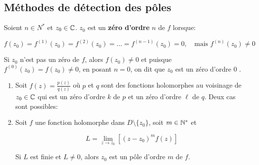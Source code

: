 \subsection{Méthodes de détection des pôles}

\begin{definition}
    Soient $n \in N^\ast$ et $z_0 \in \mathbb{C}$. $z_0$ est un \textbf{zéro d'ordre} $n$ de $f$ lorsque:
    
    \[ f(z_0) = f^{(1)}(z_0) = f^{(2)}(z_0) = \ldots = f^{(n-1)}(z_0) = 0 , \quad \textrm{mais } f^{(n)}(z_0) \neq 0 \]
\end{definition}

\begin{convention}
    Si $z_0$ n'est pas un zéro de $f$, alors $f(z_0) \neq 0$ et puisque $f^{(0)}(z_0) = f(z_0) \neq 0$, en posant $n=0$, on dit que \og $z_0$ est un zéro d'ordre 0 \fg{}.
\end{convention}

\begin{method}\hfill
    
    \begin{enumerate}[label=\alph*)]
    \item 
    Soit $f(z) = \frac{p(z)}{q(z)}$ où $p$ et $q$ sont des fonctions holomorphes au voisinage de $z_0 \in \mathbb{C}$ qui est un zéro d'ordre $k$ de $p$ et un zéro d'ordre $\ell$ de $q$.
    Deux cas sont possibles:

    \item 
    Soit $f$ une fonction holomorphe dans $D \setminus \{z_0\}$, soit $m \in \mathbb{N}^\ast$ et
    
    \[ L = \lim\limits_{z \rightarrow z_0} \left[ (z - z_0)^m f(z) \right] \]
    
    Si $L$ est finie et $L \neq 0$, alors $z_0$ est un pôle d'ordre $m$ de $f$.
    \end{enumerate}
\end{method}

